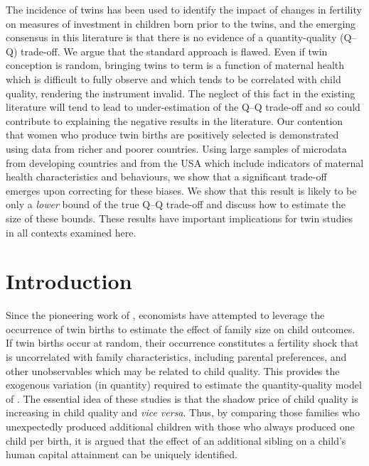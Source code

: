 \begin{chapabstract}
 The incidence of twins has been used to identify the impact of changes in 
 fertility on measures of investment in children born prior to the twins, and
 the emerging consensus in this literature is that there is no evidence of a
 quantity-quality (Q--Q) trade-off. We argue that the standard approach is 
 flawed. Even if twin conception is random, bringing twins to term is a function 
 of maternal health which is difficult to fully observe and which tends to be
 correlated with child quality, rendering the instrument invalid. The neglect
 of this fact in the existing literature will tend to lead to under-estimation 
 of the Q--Q trade-off and so could contribute to explaining the negative results
 in the literature. Our contention that women who produce twin births are
 positively selected is demonstrated using data from richer and poorer countries.
 Using large samples of microdata from developing countries and from the USA 
 which include indicators of maternal health characteristics and behaviours, we
 show that a significant trade-off emerges upon correcting for these biases. We
 show that this result is likely to be only a \emph{lower} bound of the true
 Q--Q trade-off and discuss how to estimate the size of these bounds. These
 results have important implications for twin studies in all contexts examined
 here.
\end{chapabstract}



\section{Introduction}                             \label{TWINscn:intro}
Since the pioneering work of \citet{RosenzweigWolpin1980}, economists have 
attempted to leverage the occurrence of twin births to estimate the effect of 
family size on child outcomes. If twin births occur at random, their occurrence 
constitutes a fertility shock that is uncorrelated with family characteristics, 
including parental preferences, and other unobservables which may be related to 
child quality. This provides the exogenous variation (in quantity) required to 
estimate the quantity-quality model of \citet{Becker1960,BeckerLewis1973,
BeckerTomes1976}.  The essential idea of these studies is that the shadow price 
of child quality is increasing in child quality and \emph{vice versa}. Thus, by 
comparing those families who unexpectedly produced additional children with 
those who always produced one child per birth, it is argued that the effect of 
an additional sibling on a child's human capital attainment can be uniquely
identified.

